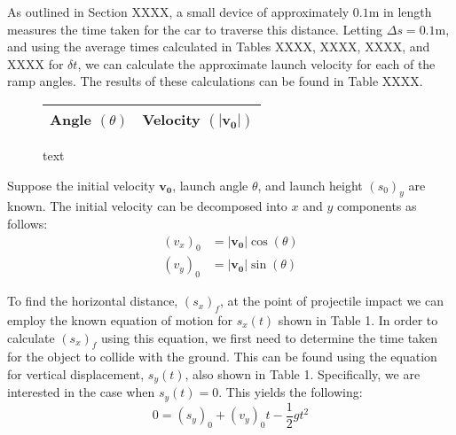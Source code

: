\documentclass[a4paper]{article}
\begin{document}
As outlined in Section XXXX, a small device of approximately $0.1\si{\meter}$ in length measures the time taken for the car to traverse this distance. Letting $\Delta s = 0.1\si{\meter}$, and using the average times calculated in Tables XXXX, XXXX, XXXX, and XXXX for $\delta t$, we can calculate the approximate launch velocity for each of the ramp angles. The results of these calculations can be found in Table XXXX.
\begin{figure}[h]
	\begin{minipage}{0.45\textwidth}
		\centering
		\begin{tabular}{ll}
			\toprule
			Angle $(\theta)$ & Velocity $(|\boldsymbol{v_0}|)$\\
			\midrule
			\bottomrule
		\end{tabular}
	\end{minipage}
	\begin{minipage}{0.45\textwidth}
		\centering
		\caption{text}
	\end{minipage}
\end{figure}

Suppose the initial velocity $\boldsymbol{v_0}$, launch angle $\theta$, and launch height $(s_0)_y$ are known. The initial velocity can be decomposed into $x$ and $y$ components as follows:
\begin{align}
(v_x)_0 &= |\boldsymbol{v_0}|\cos(\theta)\\
(v_y)_0 &= |\boldsymbol{v_0}|\sin(\theta)
\end{align}

To find the horizontal distance, $(s_x)_f$, at the point of projectile impact we can employ the known equation of motion for $s_x(t)$ shown in Table 1. In order to calculate $(s_x)_f$ using this equation, we first need to determine the time taken for the object to collide with the ground. This can be found using the equation for vertical displacement, $s_y(t)$, also shown in Table 1. Specifically, we are interested in the case when $s_y(t) = 0$. This yields the following:
\begin{equation}
0 = (s_y)_0 + (v_y)_0 t - \frac{1}{2}gt^2
\end{equation}
\end{document}
